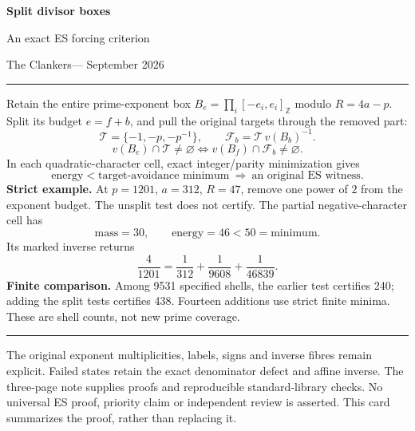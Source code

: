 \documentclass[11pt]{article}
\begin{document}
\begin{center}
{\Large\bfseries Split divisor boxes\par}
\vspace{2mm}
{\large An exact ES forcing criterion}\par
\vspace{2mm}
The Clankers\quad--- September 2026
\end{center}
\hrule\vspace{4mm}
Retain the entire prime-exponent box $B_e=\prod_i[-e_i,e_i]_{\mathbb Z}$
modulo $R=4a-p$. Split its budget $e=f+b$, and pull the original targets
through the removed part:
\[
\mathcal T=\{-1,-p,-p^{-1}\},\qquad
\mathcal F_b=\mathcal T\,v(B_b)^{-1}.
\]
\[
\boxed{v(B_e)\cap\mathcal T\ne\varnothing
\iff v(B_f)\cap\mathcal F_b\ne\varnothing.}
\]
In each quadratic-character cell, exact integer/parity minimization gives
\[
\boxed{\text{energy}<\text{target-avoidance minimum}
\ \Longrightarrow\ \text{an original ES witness}.}
\]
\textbf{Strict example.} At $p=1201$, $a=312$, $R=47$, remove one
power of $2$ from the exponent budget. The unsplit test does not certify.
The partial negative-character cell has
\[
\text{mass}=30,\qquad\text{energy}=46<50=\text{minimum}.
\]
Its marked inverse returns
\[
\boxed{\frac4{1201}=\frac1{312}+\frac1{9608}+\frac1{46839}.}
\]
\textbf{Finite comparison.} Among 9531 specified shells, the earlier test
certifies 240; adding the split tests certifies 438. Fourteen additions use
strict finite minima. These are shell counts, not new prime coverage.

\vspace{3mm}\hrule\vspace{3mm}
\small
The original exponent multiplicities, labels, signs and inverse fibres remain
explicit. Failed states retain the exact denominator defect and affine inverse.
The three-page note supplies proofs and reproducible standard-library checks.
No universal ES proof, priority claim or independent review is asserted.
This card summarizes the proof, rather than replacing it.
\end{document}
